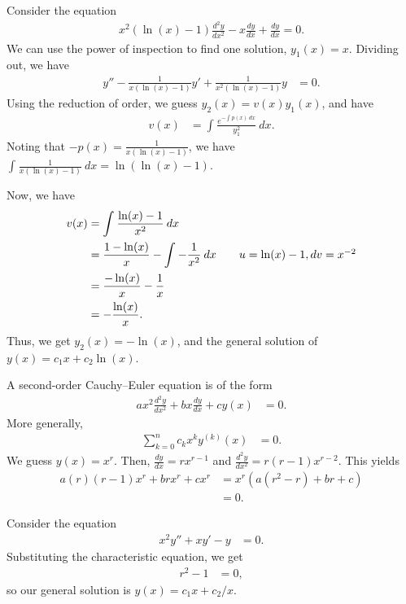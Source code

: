 \documentclass[10pt]{mypackage}
\begin{document}
\begin{example}
  Consider the equation
  \begin{align*}
    x^2\left(\ln(x)-1\right)\frac{d^2y}{dx^2} -x\frac{dy}{dx} + \frac{dy}{dx} = 0.
  \end{align*}
  We can use the power of inspection to find one solution, $y_1(x) = x$. Dividing out, we have
  \begin{align*}
    y'' - \frac{1}{x\left(\ln(x) - 1\right)} y' + \frac{1}{x^2\left(\ln(x) - 1\right)}y &= 0.
  \end{align*}
  Using the reduction of order, we guess $y_2(x) = v(x)y_1(x)$, and have
  \begin{align*}
    v(x) &= \int_{}^{} \frac{e^{-\int_{}^{} p(x)\:dx}}{y_1^2}\:dx.
  \end{align*}
  Noting that $-p(x) = \frac{1}{x\left(\ln(x)-1\right)}$, we have $\int_{}^{} \frac{1}{x\left(\ln(x)-1\right)}\:dx = \ln\left(\ln(x)-1\right)$.\newline

  Now, we have
  \begin{align*}
    v(x) &= \int_{}^{} \frac{\ln(x)-1}{x^2}\:dx\\
         &= \frac{1-\ln(x)}{x} - \int_{}^{} -\frac{1}{x^2}\:dx\tag*{$u=\ln(x)-1,dv=x^{-2}$}\\
         &= \frac{-\ln(x)}{x} - \frac{1}{x}\\
         &= -\frac{\ln(x)}{x}.
  \end{align*}
  Thus, we get $y_2(x) = -\ln(x)$, and the general solution of $y(x) = c_1 x + c_2\ln(x)$.
\end{example}
\begin{example}
  A second-order Cauchy--Euler equation is of the form
  \begin{align*}
    ax^2\frac{d^2y}{dx^2} + bx\frac{dy}{dx} + cy(x) &= 0.
  \end{align*}
  More generally,
  \begin{align*}
    \sum_{k=0}^{n}c_kx^ky^{(k)}(x) &= 0.
  \end{align*}
  We guess $y(x) = x^r$. Then, $\frac{dy}{dx} = rx^{r-1}$ and $\frac{d^2y}{dx^2} = r(r-1)x^{r-2}$. This yields
  \begin{align*}
    a(r)(r-1)x^r + brx^{r} + cx^r &=x^r \left(a\left(r^2 - r\right) + br + c\right)\\
                                  &= 0.
  \end{align*}
\end{example}
\begin{example}
  Consider the equation
  \begin{align*}
    x^2y'' + xy' - y &= 0.
  \end{align*}
  Substituting the characteristic equation, we get
  \begin{align*}
    r^2 - 1 &= 0,
  \end{align*}
  so our general solution is $y(x) = c_1x + c_2/x$.
\end{example}
\end{document}
